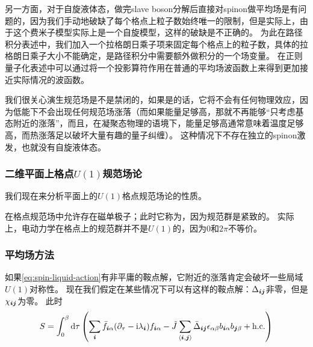 另一方面，对于自旋液体态，做完slave boson分解后直接对spinon做平均场是有问题的，因为我们手动地破缺了每个格点上粒子数始终唯一的限制，但是实际上，由于这个费米子模型实际上是一个自旋模型，这样的破缺是不正确的。
为此在路径积分表述中，我们加入一个拉格朗日乘子项来固定每个格点上的粒子数，具体的拉格朗日乘子大小不能确定，是路径积分中需要额外做积分的一个场变量。
在正则量子化表述中可以通过将一个投影算符作用在普通的平均场波函数上来得到更加接近实际情况的波函数。

我们很关心演生规范场是不是禁闭的，如果是的话，它将不会有任何物理效应，因为低能下不会出现任何规范场涨落（而如果能量足够高，那就不再能够“只考虑基态附近的涨落”，而且，在凝聚态物理的语境下，能量足够高通常意味着温度足够高，而热涨落足以破坏大量有趣的量子纠缠）。
这种情况下不存在独立的spinon激发，也就没有自旋液体态。

\subsubsection{二维平面上格点$U(1)$规范场论}

我们现在来分析平面上的$U(1)$格点规范场论的性质。

在格点规范场中允许存在磁单极子；此时它称为，因为规范群是紧致的。
实际上，电动力学在格点上的规范群并不是$U(1)$的，因为$0$和$2\pi$不等价。

\subsubsection{平均场方法}

如果\eqref{eq:spin-liquid-action}有非平庸的鞍点解，它附近的涨落肯定会破坏一些局域$U(1)$对称性。
现在我们假定在某些情况下可以有这样的鞍点解：$\Delta_{\vb*{i} \vb*{j}}$非零，但是$\chi_{\vb*{i} \vb*{j}}$为零。
此时
\begin{equation}
    S = \int_0^\beta \dd{\tau} \left( \sum_{\vb*{i}} \bar{f}_{\vb*{i} \alpha} (\partial_\tau - \mathrm{i} \lambda_{\vb*{i}}) f_{\vb*{i} \alpha} - \tilde{J} \sum_{\langle \vb*{i}, \vb*{j} \rangle} \bar{\Delta}_{\vb*{i} \vb*{j}} \epsilon_{\alpha \beta} b_{\vb*{i} \alpha} b_{\vb*{j} \beta} + \text{h.c.} \right)
\end{equation}

